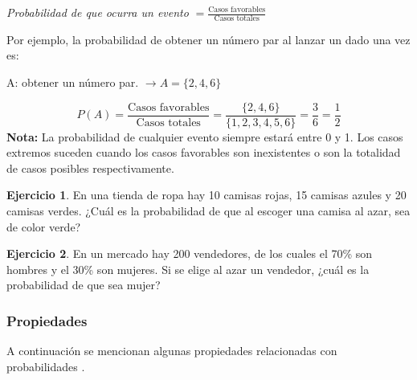 \documentclass[
  11pt,
]{book}
\theoremstyle{definition}
\theoremstyle{definition}
\theoremstyle{definition}
\newtheorem{exercise}{Ejercicio}[chapter]
\theoremstyle{definition}
\theoremstyle{remark}
\begin{document}
\emph{Probabilidad de que ocurra un evento} \(= \displaystyle\frac{\text{Casos favorables}}{\text{Casos totales}}\)

Por ejemplo, la probabilidad de obtener un número par al lanzar un dado una vez es:

A: obtener un número par. \(\rightarrow A = \lbrace 2,4,6 \rbrace\)

\[P(A) = \frac{\text{Casos favorables}}{\text{Casos totales}} = \frac{\lbrace 2,4,6 \rbrace}{\lbrace 1,2,3,4,5,6 \rbrace} = \frac{3}{6}= \frac{1}{2}\]
\textbf{Nota:} La probabilidad de cualquier evento siempre estará entre 0 y 1. Los casos extremos suceden cuando los casos favorables son inexistentes o son la totalidad de casos posibles respectivamente.

\begin{exercise}
En una tienda de ropa hay 10 camisas rojas, 15 camisas azules y 20 camisas verdes. ¿Cuál es la probabilidad de que al escoger una camisa al azar, sea de color verde?
\end{exercise}

\begin{exercise}
En un mercado hay 200 vendedores, de los cuales el 70\% son hombres y el 30\% son mujeres. Si se elige al azar un vendedor, ¿cuál es la probabilidad de que sea mujer?
\end{exercise}

\subsubsection{Propiedades}\label{propiedades}

A continuación se mencionan algunas propiedades relacionadas con probabilidades \citep[página 157]{anderson}.
\end{document}
